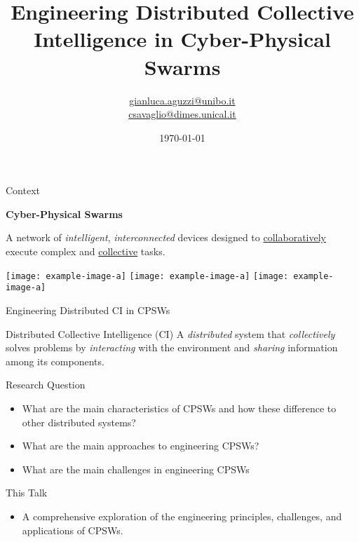 \documentclass[presentation, 9pt]{beamer}\mode<presentation>{\usetheme{AMSBolognaFC}}
\title[Engineering Distributed CI in
CPSWs]
{Engineering Distributed Collective Intelligence in
Cyber-Physical Swarms}
\author[\sspeaker{Aguzzi}]
{\speaker{\textbf{Gianluca Aguzzi}} \href{mailto:gianluca.aguzzi@unibo.it}{gianluca.aguzzi@unibo.it} \\ 
\speaker{Claudio Savaglio} \href{mailto:csavaglio@dimes.unical.it}{csavaglio@dimes.unical.it}
}
\institute[DISI, Univ.\ Bologna]
{%
\textsc{University of Bologna}
\\
\textsc{University of Calabria}
\\[0.1cm]
\textbf{Talk @} \bold{International Conference on Autonomic Computing and Self-Organizing Systems (ACSOS)}\\[0.15cm]
}
\date[\today]{\today}
\begin{document}
\frame{\titlepage}
\begin{frame}{Context}
  \begin{center}
  \Huge{\textbf{Cyber-Physical Swarms}}

  \large{
  A  network of \emph{intelligent}, \emph{interconnected} devices designed to \underline{collaboratively} execute complex and \underline{collective} tasks.}
  \end{center}
  \begin{center}
  \texttt{[image: example-image-a]}
  \texttt{[image: example-image-a]}
  \texttt{[image: example-image-a]}
  \end{center}
\end{frame}
\begin{frame}{Engineering Distributed CI in CPSWs}
  \begin{exampleblock}{Distributed Collective Intelligence (CI)}
    A \emph{distributed} system that \emph{collectively} solves problems by \emph{interacting} with the environment and \emph{sharing} information among its components.
  \end{exampleblock}
  \begin{alertblock}{Research Question}
    \begin{itemize}
      \item What are the main characteristics of CPSWs and how
      these difference to other distributed systems?
      \item What are the main approaches to engineering CPSWs?
      \item What are the main challenges in engineering CPSWs
    \end{itemize}
  \end{alertblock}
  \begin{block}{This Talk}
    \begin{itemize}
      \item A comprehensive exploration of
      the engineering principles, challenges, and applications of CPSWs.
    \end{itemize}
  \end{block}
\end{frame}
\end{document}
